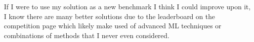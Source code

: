 \documentclass[11pt]{article}
\begin{document}
If I were to use my solution as a new benchmark I think I could improve
upon it, I know there are many better solutions due to the leaderboard
on the competition page which likely make used of advanced ML techniques
or combinations of methods that I never even considered.


    
    
    
    
\end{document}
